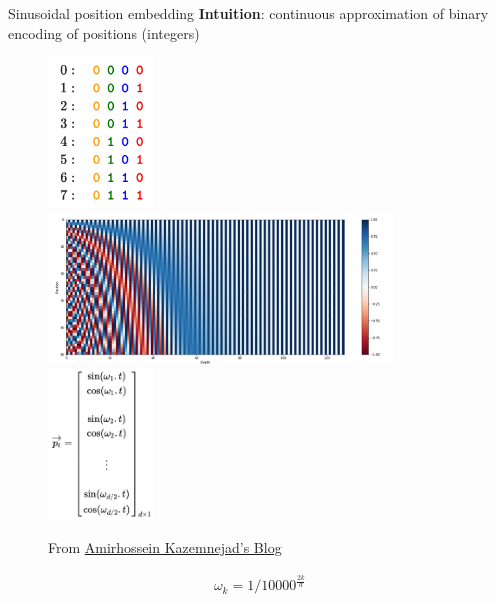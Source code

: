 \documentclass[usenames,dvipsnames,notes,11pt,aspectratio=169,hyperref={colorlinks=true, linkcolor=blue}]{beamer}
\begin{document}
\begin{frame}
    {Sinusoidal position embedding}
    \textbf{Intuition}: continuous approximation of binary encoding of positions (integers)
    \vspace{-2em}

    \begin{figure}
        \includegraphics[height=4cm]{figures/binary}\pause
        \includegraphics[height=4cm]{figures/sin}\pause
        \includegraphics[height=4cm]{figures/pos}
        \caption{From \href{https://kazemnejad.com/blog/transformer_architecture_positional_encoding/}{Amirhossein Kazemnejad's Blog}}
    \end{figure}

    \vspace{-2em}
    \begin{align*}
        \omega_{k} = 1 / 10000^{\frac{2k}{d}}
    \end{align*}
\end{frame}
\end{document}
